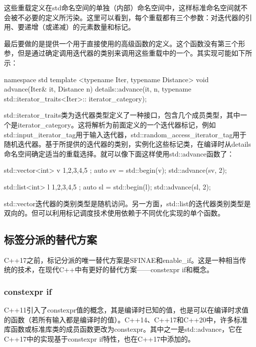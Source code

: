 这些重载定义在std命名空间的单独（内部）命名空间中，这样标准命名空间就不会被不必要的定义所污染。这里可以看到，每个重载都有三个参数：对迭代器的引用、要递增（或递减）的元素数量和标记。

最后要做的是提供一个用于直接使用的高级函数的定义。这个函数没有第三个形参，但是通过确定调用迭代器的类别来调用这些重载中的一个。其实现可能如下所示：

\begin{cppcode}
namespace std
{
	template <typename Iter, typename Distance>
	void advance(Iter& it, Distance n)
	{
		details::advance(it, n,
			typename std::iterator_traits<Iter>::
								iterator_category{});
	}
}
\end{cppcode}

std::iterator_traits类为迭代器类型定义了一种接口，包含几个成员类型，其中一个是iterator_category。这将解析为前面定义的一个迭代器标记，例如std::input_iterator_tag用于输入迭代器，std::random_access_iterator_tag用于随机迭代器。基于所提供的迭代器的类别，实例化这些标记类，在编译时从details命名空间确定适当的重载选择。就可以像下面这样使用std::advance函数了：

\begin{cppcode}
std::vector<int> v{ 1,2,3,4,5 };
auto sv = std::begin(v);
std::advance(sv, 2);

std::list<int> l{ 1,2,3,4,5 };
auto sl = std::begin(l);
std::advance(sl, 2);
\end{cppcode}

std::vector迭代器的类别类型是随机访问。另一方面，std::list的迭代器类别类型是双向的。但可以利用标记调度技术使用依赖于不同优化实现的单个函数。

\subsection{标签分派的替代方案}

C++17之前，标记分派的唯一替代方案是SFINAE和enable_if。这是一种相当传统的技术，在现代C++中有更好的替代方案——constexpr if和概念。

\subsubsection{constexpr if}

C++11引入了constexpr值的概念，其是编译时已知的值，也是可以在编译时求值的函数（若所有输入都是编译时的值）。C++14、C++17和C++20中，许多标准库函数或标准库类的成员函数更改为constexpr。其中之一是std::advance，它在C++17中的实现基于constexpr if特性，也在C++17中添加的。

